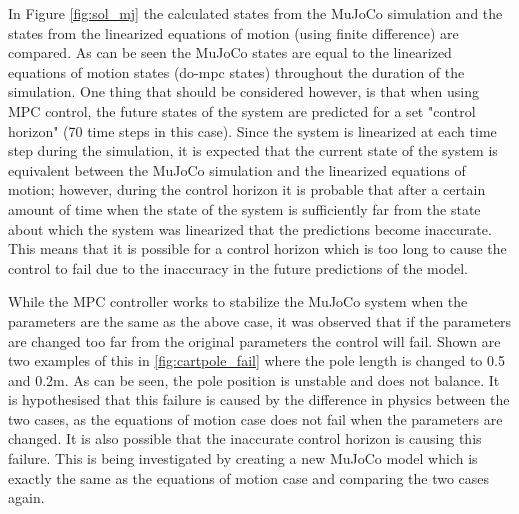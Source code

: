 \documentclass{./springer/svjour3}
\begin{document}
In Figure \ref{fig:sol_mj} the calculated states from the MuJoCo simulation and the states from the linearized equations of motion (using 
finite difference) are compared. As can be seen the MuJoCo states are equal to the linearized equations of motion states (do-mpc states) throughout the duration 
of the simulation. One thing that should be considered however, is that when using MPC control, the future states of the system are predicted for a set 
"control horizon" (70 time steps in this case). Since the system is linearized at each time step during the simulation, it is expected that the current state of the 
system is equivalent between the MuJoCo simulation and the linearized equations of motion; however, during the control horizon it is probable that after a certain amount of time 
when the state of the system is sufficiently far from the state about which the system was linearized that the predictions become inaccurate. This means that it is possible 
for a control horizon which is too long to cause the control to fail due to the inaccuracy in the future predictions of the model.

While the MPC controller works to stabilize the MuJoCo system when the parameters are the same as the above case, it was observed 
that if the parameters are changed too far from the original parameters the control will fail. Shown are two examples of this in 
\ref{fig:cartpole_fail} where the pole length is changed to 0.5 and 0.2m.
As can be seen, the pole position is unstable and does not balance. It is hypothesised that 
this failure is caused by the difference in physics between the two cases, as the equations of motion case does not fail when the parameters are changed. It is also possible 
that the inaccurate control horizon is causing this failure. This is being investigated by creating a new MuJoCo model which is exactly the same as the equations of motion case 
and comparing the two cases again.
\end{document}
